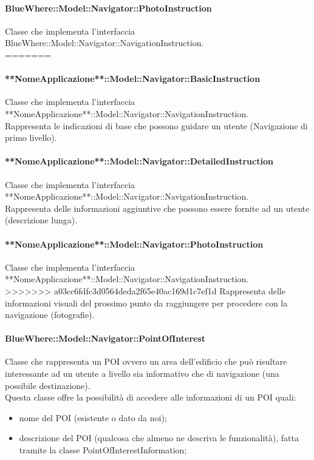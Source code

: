 \documentclass[../SpecificaTecnica.tex]{subfiles}
\begin{document}
				\paragraph{BlueWhere::Model::Navigator::PhotoInstruction}
					Classe che implementa l'interfaccia BlueWhere::Model::Navigator::NavigationInstruction. \\
=======
				\paragraph{**NomeApplicazione**::Model::Navigator::BasicInstruction}
					Classe che implementa l'interfaccia\\ **NomeApplicazione**::Model::Navigator::NavigationInstruction. \\
					Rappresenta le indicazioni di base che possono guidare un utente (Navigazione di primo livello).
				\paragraph{**NomeApplicazione**::Model::Navigator::DetailedInstruction}
					Classe che implementa l'interfaccia\\ **NomeApplicazione**::Model::Navigator::NavigationInstruction. \\
					Rappresenta delle informazioni aggiuntive che possono essere fornite ad un utente (descrizione lunga).
				\paragraph{**NomeApplicazione**::Model::Navigator::PhotoInstruction}
					Classe che implementa l'interfaccia\\ **NomeApplicazione**::Model::Navigator::NavigationInstruction. \\
>>>>>>> a03cc6fdfc3d0564deda2f65e40ac169d1c7ef1d
					Rappresenta delle informazioni visuali del prossimo punto da raggiungere per procedere con la navigazione (fotografie).
				\paragraph{BlueWhere::Model::Navigator::PointOfInterest}
					Classe che rappresenta un POI ovvero un area dell'edificio che può risultare interessante ad un utente a livello sia informativo che di navigazione (una possibile destinazione). \\
					Questa classe offre la possibilità di accedere alle informazioni di un POI quali:
					\begin{itemize}
						\item nome del POI (esistente o dato da noi);
						\item descrizione del POI (qualcosa che almeno ne descriva le funzionalità), fatta tramite la classe PointOfInterestInformation;
					\end{itemize}
\end{document}
